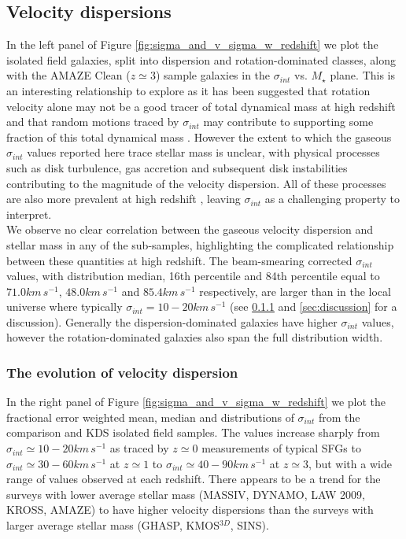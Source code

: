 \documentclass[fleqn,usenatbib]{mnras}
\begin{document}
\subsection{Velocity dispersions}\label{subsec:results_velocity_dispersions}

In the left panel of Figure \ref{fig:sigma_and_v_sigma_w_redshift} we plot the isolated field galaxies, split into dispersion and rotation-dominated classes, along with the AMAZE Clean ($z\simeq3$) sample galaxies in the $\sigma_{int}$ vs. $M_{\star}$ plane.
This is an interesting relationship to explore as it has been suggested that rotation velocity alone may not be a good tracer of total dynamical mass at high redshift and that random motions traced by $\sigma_{int}$ may contribute to supporting some fraction of this total dynamical mass \citep[e.g.][]{Kassin2007,Burkert2010,Kassin2012,Law2012b,Law2012c,Ubler2017,Genzel2017}.
However the extent to which the gaseous $\sigma_{int}$ values reported here trace stellar mass is unclear, with physical processes such as disk turbulence, gas accretion and subsequent disk instabilities contributing to the magnitude of the velocity dispersion.
All of these processes are also more prevalent at high redshift \citep{Genzel2006,ForsterSchreiber2009,Law2009,Genzel2011,Wisnioski2015,Wuyts2016b}, leaving $\sigma_{int}$ as a challenging property to interpret. \\ 

\noindent
We observe no clear correlation between the gaseous velocity dispersion and stellar mass in any of the sub-samples, highlighting the complicated relationship between these quantities at high redshift.
The beam-smearing corrected $\sigma_{int}$ values, with distribution median, 16th percentile and 84th percentile equal to $71.0km\,s^{-1}$, $48.0km\,s^{-1}$ and $85.4km\,s^{-1}$ respectively, are larger than in the local universe where typically $\sigma_{int} = 10-20km\,s^{-1}$ \citep{Epinat2008a} (see \cref{subsubsec:sigma_evolution} and \cref{sec:discussion} for a discussion).
Generally the dispersion-dominated galaxies have higher $\sigma_{int}$ values, however the rotation-dominated galaxies also span the full distribution width.

\subsubsection{The evolution of velocity dispersion}\label{subsubsec:sigma_evolution}

In the right panel of Figure \ref{fig:sigma_and_v_sigma_w_redshift} we plot the fractional error weighted mean, median and distributions of $\sigma_{int}$ from the comparison and KDS isolated field samples.
The values increase sharply from $\sigma_{int}\simeq10-20km\,s^{-1}$ as traced by $z\simeq0$ measurements of typical SFGs to $\sigma_{int}\simeq30-60km\,s^{-1}$ at $z\simeq1$ to $\sigma_{int}\simeq40-90km\,s^{-1}$ at $z\simeq3$, but with a wide range of values observed at each redshift.
There appears to be a trend for the surveys with lower average stellar mass (MASSIV, DYNAMO, LAW 2009, KROSS, AMAZE) to have higher velocity dispersions than the surveys with larger average stellar mass (GHASP, KMOS$^{3D}$, SINS).
\end{document}
